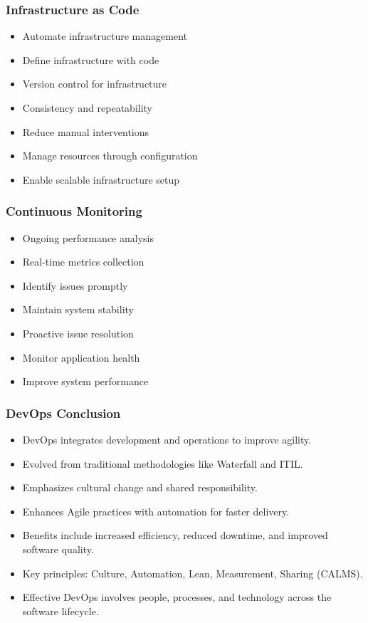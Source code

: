 \documentclass[aspectratio=169, table]{beamer}
\begin{document}
\begin{frame}
	\frametitle{Infrastructure as Code}
	\begin{itemize}
		\item Automate infrastructure management
		\item Define infrastructure with code
		\item Version control for infrastructure
		\item Consistency and repeatability
		\item Reduce manual interventions
		\item Manage resources through configuration
		\item Enable scalable infrastructure setup
	\end{itemize}
\end{frame}

\begin{frame}
	\frametitle{Continuous Monitoring}
	\begin{itemize}
		\item Ongoing performance analysis
		\item Real-time metrics collection
		\item Identify issues promptly
		\item Maintain system stability
		\item Proactive issue resolution
		\item Monitor application health
		\item Improve system performance
	\end{itemize}
\end{frame}

\begin{frame}
	\frametitle{DevOps Conclusion}
	\vspace{15pt}
	\begin{itemize}
		\item DevOps integrates development and operations to improve agility.
		\item Evolved from traditional methodologies like Waterfall and ITIL.
		\item Emphasizes cultural change and shared responsibility.
		\item Enhances Agile practices with automation for faster delivery.
		\item Benefits include increased efficiency, reduced downtime, and improved software quality.
		\item Key principles: Culture, Automation, Lean, Measurement, Sharing (CALMS).
		\item Effective DevOps involves people, processes, and technology across the software lifecycle.
	\end{itemize}
\end{frame}
\end{document}
